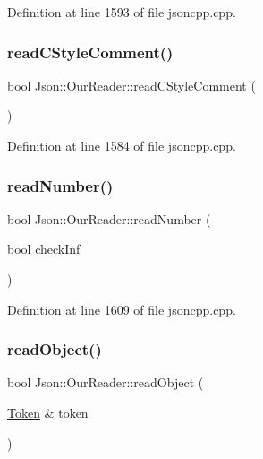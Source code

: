 Definition at line 1593 of file jsoncpp.\+cpp.

\hypertarget{class_json_1_1_our_reader_aba784b125baa1b62387e767b791f2f89}{}\label{class_json_1_1_our_reader_aba784b125baa1b62387e767b791f2f89} 
\subsubsection{\texorpdfstring{read\+C\+Style\+Comment()}{readCStyleComment()}}
{\footnotesize\ttfamily bool Json\+::\+Our\+Reader\+::read\+C\+Style\+Comment (\begin{DoxyParamCaption}{ }\end{DoxyParamCaption})\hspace{0.3cm}{\ttfamily [private]}}



Definition at line 1584 of file jsoncpp.\+cpp.

\hypertarget{class_json_1_1_our_reader_aefcb9a78cc45870ccac2db2a66c8ec50}{}\label{class_json_1_1_our_reader_aefcb9a78cc45870ccac2db2a66c8ec50} 
\subsubsection{\texorpdfstring{read\+Number()}{readNumber()}}
{\footnotesize\ttfamily bool Json\+::\+Our\+Reader\+::read\+Number (\begin{DoxyParamCaption}\item[{bool}]{check\+Inf }\end{DoxyParamCaption})\hspace{0.3cm}{\ttfamily [private]}}



Definition at line 1609 of file jsoncpp.\+cpp.

\hypertarget{class_json_1_1_our_reader_aea198f8101dba55099f4d8121a993530}{}\label{class_json_1_1_our_reader_aea198f8101dba55099f4d8121a993530} 
\subsubsection{\texorpdfstring{read\+Object()}{readObject()}}
{\footnotesize\ttfamily bool Json\+::\+Our\+Reader\+::read\+Object (\begin{DoxyParamCaption}\item[{\hyperlink{class_json_1_1_our_reader_1_1_token}{Token} \&}]{token }\end{DoxyParamCaption})\hspace{0.3cm}{\ttfamily [private]}}



